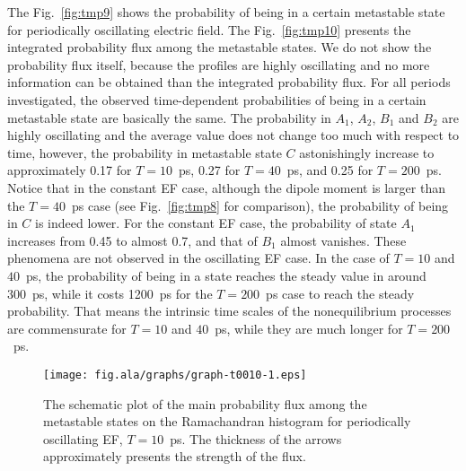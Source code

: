 \documentclass[aip,jcp,a4paper,preprint,onecolumn]{revtex4-1}
\begin{document}
The Fig.~\ref{fig:tmp9} shows the probability of being in a certain
metastable state for periodically oscillating electric field.  The
Fig.~\ref{fig:tmp10} presents the integrated probability flux among
the metastable states. We do not show the probability flux itself,
because the profiles are highly oscillating and no more
information can be obtained than the integrated probability flux.
For all periods investigated,
the observed time-dependent probabilities of being in a certain metastable
state are basically the same.
The probability in $A_1$, $A_2$, $B_1$ and $B_2$ are
highly oscillating and the average value does not change
too much with respect to time,
however, the probability in metastable state $C$ astonishingly
increase to approximately 0.17 for $T=10$~ps, 0.27 for  $T=40$~ps, and
0.25 for $T=200$~ps.
Notice that in the constant EF case, although the dipole moment is
larger than the  $T=40$~ps case (see Fig.~\ref{fig:tmp8} for comparison), the
probability of being in $C$ is indeed lower.
For the constant EF case, the probability of state $A_1$
increases from 0.45 to almost 0.7, and that of $B_1$ almost vanishes.
These phenomena are not observed in the oscillating EF case.
In the case of $T=10$ and $40$~ps, the probability of being in a state
reaches the steady value in around 300~ps, while it costs 1200~ps
for the $T=200$~ps case to reach the steady probability. That means
the intrinsic time scales of the nonequilibrium processes are commensurate
for $T=10$ and $40$~ps, while they are much longer for $T=200$~ps.

\begin{figure}
  \centering
  \texttt{[image: fig.ala/graphs/graph-t0010-1.eps]}
  \caption{The schematic plot of the main probability flux among the metastable
    states on the Ramachandran histogram
    for periodically oscillating EF, $T=10$~ps. The thickness 
    of the arrows approximately presents the strength of the flux.
  }
  \label{fig:tmp11}
\end{figure}
\end{document}
